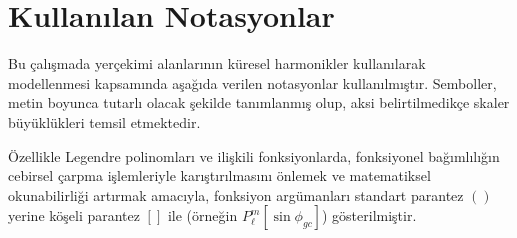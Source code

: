 \chapter*{Kullanılan Notasyonlar}

Bu çalışmada yerçekimi alanlarının küresel harmonikler kullanılarak modellenmesi kapsamında aşağıda verilen notasyonlar kullanılmıştır. Semboller, metin boyunca tutarlı olacak şekilde tanımlanmış olup, aksi belirtilmedikçe skaler büyüklükleri temsil etmektedir.

\medskip
Özellikle Legendre polinomları ve ilişkili fonksiyonlarda, fonksiyonel bağımlılığın cebirsel çarpma işlemleriyle karıştırılmasını önlemek ve matematiksel okunabilirliği
artırmak amacıyla, fonksiyon argümanları standart parantez $()$ yerine köşeli parantez $[]$ ile (örneğin $P_{\ell}^{m}[\sin\phi_{gc}]$) gösterilmiştir.

\vspace{0.4cm}

\setlength{\LTpre}{0pt}
\setlength{\LTpost}{0pt}
\renewcommand{\arraystretch}{1.15}

